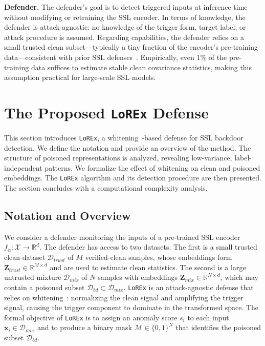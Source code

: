 \documentclass[letterpaper,twocolumn,10pt]{article}
\begin{document}
\par \textbf{Defender.} The defender's goal is to detect triggered inputs at inference time without modifying or retraining the SSL encoder. In terms of knowledge, the defender is attack-agnostic: no knowledge of the trigger form, target label, or attack procedure is assumed. Regarding capabilities, the defender relies on a small trusted clean subset---typically a tiny fraction of the encoder's pre-training data---consistent with prior SSL defenses~\cite{asset,hou2025dede}. Empirically, even 1\% of the pre-training data suffices to estimate stable clean covariance statistics, making this assumption practical for large-scale SSL models.



\section{The Proposed \texttt{LoREx} Defense}

\par 
This section introduces \texttt{LoREx}, a whitening~\cite{kessy2018optimal}-based defense for SSL backdoor detection. We define the notation and provide an overview of the method. The structure of poisoned representations is analyzed, revealing low-variance, label-independent patterns. We formalize the effect of whitening on clean and poisoned embeddings. The \texttt{LoREx} algorithm and its detection procedure are then presented. The section concludes with a computational complexity analysis.



\subsection{Notation and Overview}
We consider a defender monitoring the inputs of a pre-trained SSL encoder $f_{\alpha}: \mathcal{X} \to \mathbb{R}^d$. The defender has access to two datasets. The first is a small trusted clean dataset $\mathcal{D}_{trust}$ of $M$ verified-clean samples, whose embeddings form $\mathbf{Z}_{trust} \in \mathbb{R}^{M \times d}$ and are used to estimate clean statistics. The second is a large untrusted mixture $\mathcal{D}_{mix}$ of $N$ samples with embeddings $\mathbf{Z}_{mix} \in \mathbb{R}^{N \times d}$, which may contain a poisoned subset $\mathcal{D}_{bd} \subset \mathcal{D}_{mix}$. \texttt{LoREx} is an attack-agnostic defense that relies on whitening~\cite{kessy2018optimal}: normalizing the clean signal and amplifying the trigger signal, causing the trigger component to dominate in the transformed space. The formal objective of \texttt{LoREx} is to assign an anomaly score $s_i$ to each input $\mathbf{x}_i \in \mathcal{D}_{mix}$ and to produce a binary mask $\mathcal{M} \in \{0,1\}^N$ that identifies the poisoned subset $\mathcal{D}_{bd}$.
\end{document}

